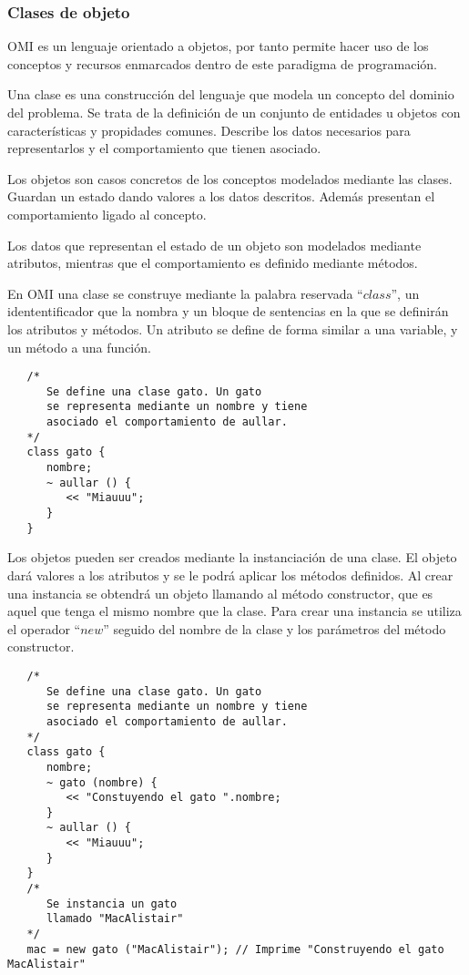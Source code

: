 \subsubsection{Clases de objeto} \label{sec:class}
OMI es un lenguaje orientado a objetos, por tanto permite hacer uso de los conceptos y recursos enmarcados
dentro de este paradigma de programación.

Una clase es una construcción del lenguaje que modela un concepto del dominio del problema. Se trata de la definición de un conjunto de entidades u objetos
con características y propidades comunes. Describe los datos necesarios para representarlos y el comportamiento que tienen asociado.

Los objetos son casos concretos de los conceptos modelados mediante las clases. Guardan un estado dando valores a los datos descritos.
Además presentan el comportamiento ligado al concepto. 

Los datos que representan el estado de un objeto son modelados mediante atributos, mientras que el comportamiento es definido mediante métodos.

En OMI una clase se construye mediante la palabra reservada ``$class$'', un idententificador que la nombra y un bloque de sentencias en la que se 
definirán los atributos y métodos. Un atributo se define de forma similar a una variable, y un método a una función. \\

\begin{lstlisting}
   /*
      Se define una clase gato. Un gato 
      se representa mediante un nombre y tiene
      asociado el comportamiento de aullar.
   */
   class gato {
      nombre;
      ~ aullar () {
         << "Miauuu";
      }
   }
\end{lstlisting}

Los objetos pueden ser creados mediante la instanciación de una clase. El objeto dará valores
a los atributos y se le podrá aplicar los métodos definidos. Al crear una instancia se 
obtendrá un objeto llamando al método constructor, que es aquel que tenga el mismo nombre que la clase. 
Para crear una instancia se utiliza el operador ``$new$'' seguido del nombre de la clase y los parámetros 
del método constructor. \\ 

\begin{lstlisting}
   /*
      Se define una clase gato. Un gato 
      se representa mediante un nombre y tiene
      asociado el comportamiento de aullar.
   */
   class gato {
      nombre;
      ~ gato (nombre) {
         << "Constuyendo el gato ".nombre;
      }
      ~ aullar () {
         << "Miauuu";
      }
   }
   /*
      Se instancia un gato 
      llamado "MacAlistair"
   */
   mac = new gato ("MacAlistair"); // Imprime "Construyendo el gato MacAlistair"
\end{lstlisting}

